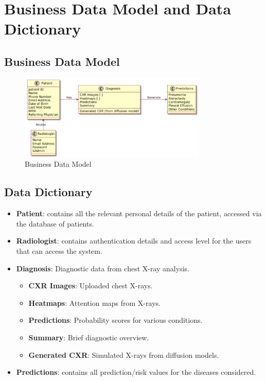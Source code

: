 \documentclass[12pt]{article}
\begin{document}
\section{Business Data Model and Data Dictionary}
\subsection{Business Data Model}
\begin{figure}[H]
    \centering
    \includegraphics[width=0.8\textwidth]{images/bussiness_data_model.png}
    \caption{Business Data Model}
    \label{fig:business_data_model}
\end{figure}
\subsection{Data Dictionary}
\begin{itemize}
    \item \textbf{Patient}: contains all the relevant personal details of the patient, accessed via the database of patients.

    \item \textbf{Radiologist}: contains authentication details and access level for the users that can access the system.

    \item \textbf{Diagnosis}: Diagnostic data from chest X-ray analysis.
    \begin{itemize}
        \item \textbf{CXR Images}: Uploaded chest X-rays.
        \item \textbf{Heatmaps}: Attention maps from X-rays.
        \item \textbf{Predictions}: Probability scores for various conditions.
        \item \textbf{Summary}: Brief diagnostic overview.
        \item \textbf{Generated CXR}: Simulated X-rays from diffusion models.
    \end{itemize}

    \item \textbf{Predictions}: contains all prediction/risk values for the diseases considered.
\end{itemize}
\end{document}
